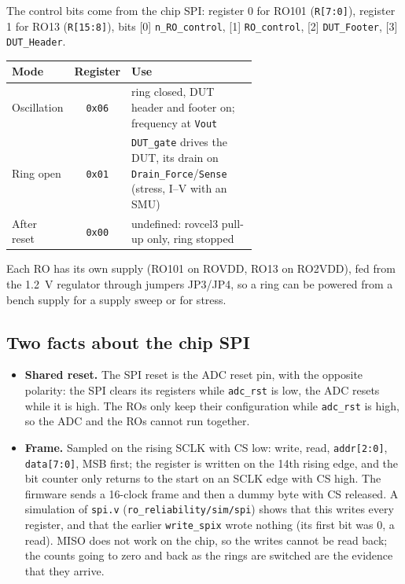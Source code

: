 \documentclass[10pt,a4paper]{article}
\begin{document}
The control bits come from the chip SPI: register 0 for RO101 (\texttt{R[7:0]}), register 1 for RO13
(\texttt{R[15:8]}), bits [0] \texttt{n\_RO\_control}, [1] \texttt{RO\_control}, [2] \texttt{DUT\_Footer},
[3] \texttt{DUT\_Header}.
\begin{center}
\begin{tabular}{lcp{0.62\linewidth}}
\toprule
Mode & Register & Use \\
\midrule
Oscillation & \texttt{0x06} & ring closed, DUT header and footer on; frequency at \texttt{Vout} \\
Ring open & \texttt{0x01} & \texttt{DUT\_gate} drives the DUT, its drain on \texttt{Drain\_Force}/\texttt{Sense}
  (stress, I--V with an SMU) \\
After reset & \texttt{0x00} & undefined: rovcel3 pull-up only, ring stopped \\
\bottomrule
\end{tabular}
\end{center}
Each RO has its own supply (RO101 on ROVDD, RO13 on RO2VDD), fed from the \SI{1.2}{V} regulator through
jumpers JP3/JP4, so a ring can be powered from a bench supply for a supply sweep or for stress.

\subsection{Two facts about the chip SPI}
\begin{itemize}
  \item \textbf{Shared reset.} The SPI reset is the ADC reset pin, with the opposite polarity: the SPI
        clears its registers while \texttt{adc\_rst} is low, the ADC resets while it is high. The ROs only
        keep their configuration while \texttt{adc\_rst} is high, so the ADC and the ROs cannot run together.
  \item \textbf{Frame.} Sampled on the rising SCLK with CS low: write, read, \texttt{addr[2:0]},
        \texttt{data[7:0]}, MSB first; the register is written on the 14th rising edge, and the bit counter
        only returns to the start on an SCLK edge with CS high. The firmware sends a 16-clock frame and then
        a dummy byte with CS released. A simulation of \texttt{spi.v} (\texttt{ro\_reliability/sim/spi}) shows that
        this writes every register, and that the earlier \texttt{write\_spix} wrote nothing (its first bit
        was 0, a read). MISO does not work on the chip, so the writes cannot be read back; the counts going
        to zero and back as the rings are switched are the evidence that they arrive.
\end{itemize}
\end{document}
